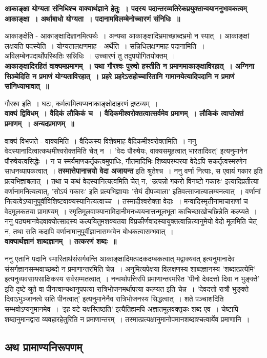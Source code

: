 {\bfseries आकाङ्क्षा योग्यता संनिधिश्च वाक्यार्थज्ञाने हेतुः~। पदस्य पदान्तरव्यतिरेकप्रयुक्तान्वयाननुभावकत्वम् आकाङ्क्षा~। अर्थाबाधो योग्यता~। पदानामविलम्बेनोच्चारणं संनिधिः~॥}\par
	आकाङ्क्षेति - आकाङ्क्षादिज्ञानमित्यर्थः~। अन्यथा आकाङ्क्षादिभ्रमाच्छाब्दभ्रमो न स्यात्~। आकाङ्क्षां लक्षयति पदस्येति~। योग्यतालक्षणमाह - अर्थेति~। सन्निधिलक्षणमाह पदानामिति~। अविलम्बेनपदार्थोपस्थितिः सन्निधिः~। उच्चारणं तु तदुपयोगितयोक्तम्~।\\[10pt]
{\bfseries आकाङ्क्षादिरहितं वाक्यमप्रमाणम्~। यथा गौरश्वः पुरुषो हस्तीति न प्रमाणमाकाङ्क्षाविरहात्~। अग्निना सिञ्चेदिति न प्रमाणं योग्यताविरहात्~। प्रहरे प्रहरेऽसहोच्चारितानि गामानयेत्यादिपदानि न प्रमाणं सांनिध्याभावात्~॥}\par
	गौरश्व इति~। घटः, कर्मत्वमित्यप्यनाकाङ्क्षोदाहरणं द्रष्टव्यम्~।\\[10pt]
{\bfseries वाक्यं द्विविधम्~। वैदिकं लौकिकं च~। वैदिकमीश्वरोक्तत्वात्सर्वमेव प्रमाणम्~। लौकिकं त्वाप्तोक्तं प्रमाणम्~। अन्यदप्रमाणम्~॥}\par
	वाक्यं विभजते - वाक्यमिति~। वैदिकस्य विशेषमाह वैदिकमीश्वरोक्तमिति~। ननु वेदस्यानादित्वात्कथमीश्वरोक्तमिति चेत् न~। ’वेदः पौरुषेयः, वाक्यसमूहत्वात् भारतादिवत्’ इत्यनुमानेन पौरुषेयत्वसिद्धेः~। न च स्मर्यमाणकर्तृकत्वमुपाधिः, गौतमादिभिः शिष्यपरम्परया वेदेऽपि सकर्तृत्वस्मरणेन साधनव्यापकत्वात्~। {\bfseries तस्मात्तेपानात्त्रयो वेदा अजायन्त} इति श्रुतेश्च~। ननु वर्णा नित्याः, स एवायं गकार इति प्रत्यभिज्ञाबलात्~। तथा च कथं वेदस्यानित्यत्वमिति चेत् न, ’उत्पन्नो गकरो विनष्टो गकारः’ इत्यादिप्रतीत्या वर्णानामनित्यत्वात्, ’सोऽयं गकारः’ इति प्रत्यभिज्ञायाः ’सेयं दीपज्वाला’ इतिवत्साजात्यालम्बनत्वात्~। वर्णानां नित्यत्वेऽप्यानुपूर्वीविशिष्टवाक्यस्यानित्यत्वाच्च~। तस्मादीश्वरोक्ता वेदाः~। मन्वादिस्मृतीनामाचाराणां च वेदमूलकतया प्रामाण्यम्~। स्मृतिमूलवाक्यानामिदानीमनध्ययनात्तन्मूलभूता काचिच्छाखोचछिन्नेति कल्प्यते~। ननु पठ्यमानवेदवाक्योत्सादस्य कल्पयितुमशक्यतया विप्रकीर्णवादस्यायुक्तत्वान्नित्यानुमेयो वेदो मूलमिति चेत् न, तथा सति कदापि वर्णानामानुपूर्वीज्ञानासम्भवेन बोधकत्वासम्भवात्~।\\[10pt]
{\bfseries वाक्यार्थज्ञानं शाब्दज्ञानम्~। तत्करणं शब्दः~॥}\par
	ननु एतानि पदानि स्मारितार्थसंसर्गवन्ति आकाङ्क्षादिमत्पदकदम्बकत्वात् मद्वाक्यवत् इत्यनुमानादेव संसर्गज्ञानसम्भवाच्छब्दो न प्रमाणान्तरमिति चेन्न~। अनुमित्यपेक्षया विलक्षणस्य शाब्दज्ञानस्य ’शब्दात्प्रत्येमि’ इत्यनुव्यवसायसाक्षिकस्य सर्वसम्मतत्वात्~। नन्वर्थापत्तिरपि प्रमाणान्तरमस्ति ’पीनो देवदत्तो दिवा न भुङ्क्ते’ इति दृष्टे श्रुते वा पीनत्वान्यथानुपपत्या रात्रिभोजनमर्थापत्या कल्प्यत इति चेन्न~। ’देवदत्तो रात्रौ भुङ्क्ते दिवाऽभुञ्जानत्वे सति पीनत्वात्’ इत्यनुमानेनैव रात्रिभोजनस्य सिद्धत्वात्~। शते पञ्चाशदिति सम्भवोऽप्यनुमानमेव~। ’इह वटे यक्षस्तिष्ठति’ इत्यैतिह्यमपि अज्ञातमूलवक्तृकः शब्द एव~। चेष्टापि शब्दानुमानद्वारा व्यवहारहेतुरिति न प्रमाणान्तरम्~। तस्मात्प्रत्यक्षानुमानोपमानशब्दाश्चत्वार्येव प्रमाणानि~। \subsection*{अथ प्रामाण्यनिरूपणम्}
